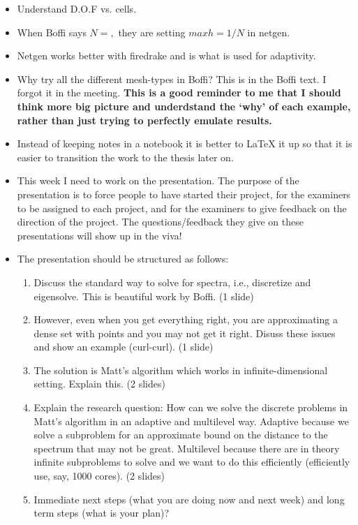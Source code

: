 \documentclass[12pt,a4paper]{article}
\begin{document}
\begin{itemize}
    \item Understand D.O.F vs. cells. 

    \item When Boffi says $N = ,$ they are setting $maxh = 1/N$ in netgen.

    \item Netgen works better with firedrake and is what is used for adaptivity.

    \item Why try all the different mesh-types in Boffi? This is in the Boffi text. I forgot it in the meeting. \textbf{This is a good reminder to me that I should think more big picture and underdstand the `why' of each example, rather than just trying to perfectly emulate results. } 

    \item Instead of keeping notes in a notebook it is better to LaTeX it up so that it is easier to transition the work to the thesis later on.

    \item This week I need to work on the presentation. The purpose of the presentation is to force people to have started their project, for the examiners to be assigned to each project, and for the examiners to give feedback on the direction of the project. The questions/feedback they give on these presentations will show up in the viva!


    \item The presentation should be structured as follows:
    \begin{enumerate}
        \item Discuss the standard way to solve for spectra, i.e., discretize and eigensolve. This is beautiful work by Boffi. (1 slide)
        \item However, even when you get everything right, you are approximating a dense set with points and you may not get it right. Disuss these issues and show an example (curl-curl). (1 slide)
        \item The solution is Matt's algorithm which works in infinite-dimensional setting. Explain this. (2 slides)
        \item Explain the research question: How can we solve the discrete problems in Matt's algorithm in an adaptive and multilevel way. Adaptive because we solve a subproblem for an approximate bound on the distance to the spectrum that may not be great. Multilevel because there are in theory infinite subproblems to solve and we want to do this efficiently (efficiently use, say, 1000 cores). (2 slides)
        \item Immediate next steps (what you are doing now and next week) and long term steps (what is your plan)? 


\end{enumerate}
\end{itemize}
\end{document}
